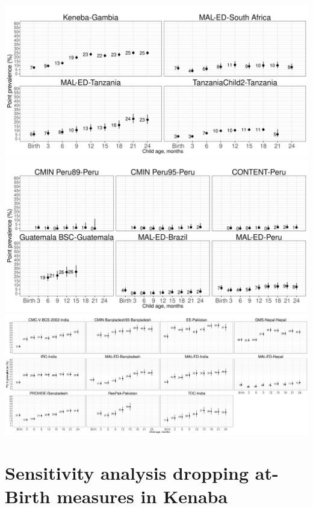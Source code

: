 \documentclass[
  9pt,
]{book}
\begin{document}
\includegraphics[width=41.67in]{figures//wasting/fig-underweight_plot_africa}
\includegraphics[width=41.67in]{figures//wasting/fig-underweight_plot_lam}
\includegraphics[width=83.33in]{figures//wasting/fig-underweight_plot_sasia}

\hypertarget{no-kenaba}{%
\chapter{Sensitivity analysis dropping at-Birth measures in Kenaba}\label{no-kenaba}}

\raggedright
\end{document}
